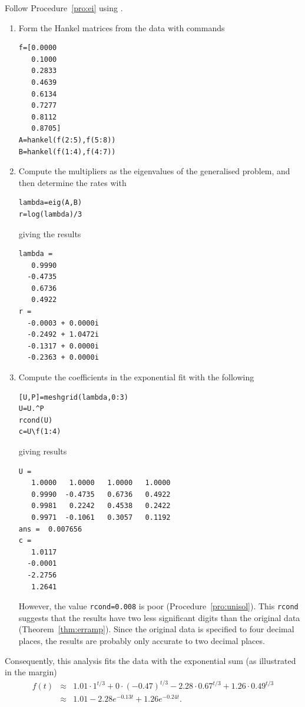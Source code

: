 \begin{draft}
\begin{example}
\begin{solution} 
Follow Procedure~\ref{pro:ei} using \script. 
\begin{enumerate}
\item Form the Hankel matrices from the data with commands
\begin{verbatim}
f=[0.0000
   0.1000
   0.2833
   0.4639
   0.6134
   0.7277
   0.8112
   0.8705]
A=hankel(f(2:5),f(5:8))
B=hankel(f(1:4),f(4:7))
\end{verbatim}
\setbox\ajrqrbox\hbox{}%
\marginpar{\usebox{\ajrqrbox}}%

\item Compute the multipliers as the eigenvalues of the generalised problem, and then determine the rates with
\begin{verbatim}
lambda=eig(A,B)
r=log(lambda)/3
\end{verbatim}
giving the results
\begin{verbatim}
lambda =
   0.9990
  -0.4735
   0.6736
   0.4922
r =
  -0.0003 + 0.0000i
  -0.2492 + 1.0472i
  -0.1317 + 0.0000i
  -0.2363 + 0.0000i
\end{verbatim}

\item Compute the coefficients in the exponential fit with the following
\begin{verbatim}
[U,P]=meshgrid(lambda,0:3)
U=U.^P
rcond(U)
c=U\f(1:4)
\end{verbatim}
giving results
\begin{verbatim}
U =
   1.0000   1.0000   1.0000   1.0000
   0.9990  -0.4735   0.6736   0.4922
   0.9981   0.2242   0.4538   0.2422
   0.9971  -0.1061   0.3057   0.1192
ans =  0.007656
c =
   1.0117
  -0.0001
  -2.2756
   1.2641
\end{verbatim}
However, the value \verb|rcond=0.008| is poor (Procedure~\ref{pro:unisol}).
This \verb|rcond| suggests that the results have two less significant digits than the original data (Theorem~\ref{thm:erramp}).
Since the original data is specified to four decimal places, the results are probably only accurate to two decimal places.
\end{enumerate}
Consequently, this analysis fits the data with the exponential sum (as illustrated in the margin)
%
\begin{eqnarray*}
f(t)&\approx&1.01\cdot1^{t/3}+0\cdot(-0.47)^{t/3}
-2.28\cdot0.67^{t/3}+1.26\cdot0.49^{t/3}
\\&\approx&1.01-2.28e^{-0.13t}+1.26e^{-0.24t}.
\end{eqnarray*}
\end{solution}
\end{example}



\end{draft}
